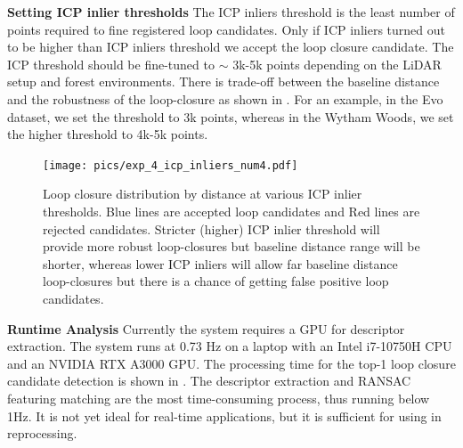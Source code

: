 \newline
\textbf{Setting ICP inlier thresholds} \hspace{0.5em} The ICP inliers threshold is the least number of points required to fine registered loop candidates. Only if ICP inliers turned out to be higher than ICP inliers threshold we accept the loop closure candidate. 
The ICP threshold should be fine-tuned to $\sim$ 3k-5k points depending on the LiDAR setup and forest environments. There is trade-off between the baseline distance and the robustness of the loop-closure as shown in . For an example, in the Evo dataset, we set the threshold to 3k points, whereas in the Wytham Woods, we set the higher threshold to 4k-5k points. \\
 \begin{figure}[t]
  \centering
  \texttt{[image: pics/exp\_4\_icp\_inliers\_num4.pdf]}
  \caption{Loop closure distribution by distance at various ICP inlier thresholds. Blue lines are accepted loop candidates and Red lines are rejected candidates. Stricter (higher) ICP inlier threshold will provide more robust loop-closures but baseline distance range will be shorter, whereas lower ICP inliers will allow far baseline distance loop-closures but there is a chance of getting false positive loop candidates.}
  \label{fig:icp_inliers_num}
\end{figure}
\newline
{\textbf{Runtime Analysis}}\hspace{0.5em} Currently the system requires a GPU for descriptor extraction. The system runs at 0.73 Hz on a laptop with an Intel i7-10750H CPU and an NVIDIA RTX A3000 GPU. The processing time for the top-1 loop closure candidate detection is shown in . The descriptor extraction and RANSAC featuring matching are the most time-consuming process, thus running below 1Hz. It is not yet ideal for real-time applications, but it is sufficient for using in reprocessing. \\
